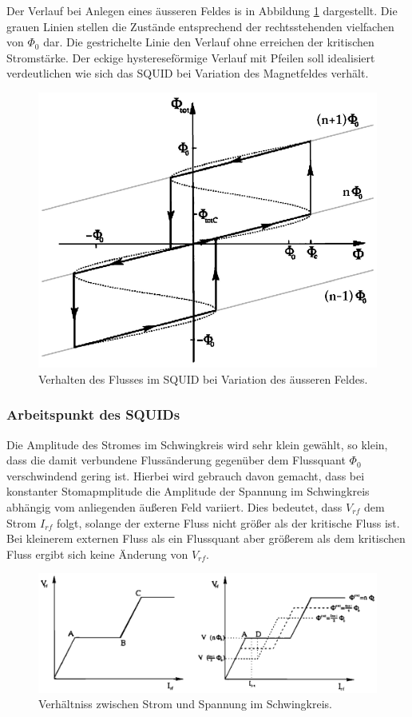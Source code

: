 \documentclass[12pt]{article}
\begin{document}
Der Verlauf bei Anlegen eines äusseren Feldes is in Abbildung \ref{verlauf} dargestellt. Die grauen Linien stellen die Zustände entsprechend der rechtsstehenden vielfachen von $\Phi_0$ dar. Die gestrichelte Linie den Verlauf ohne erreichen der kritischen Stromstärke. Der eckige hystereseförmige Verlauf mit Pfeilen soll idealisiert verdeutlichen wie sich das SQUID bei Variation des Magnetfeldes verhält. 
\begin{figure}[H]
\centering
\includegraphics[width=0.9\linewidth]{pictures/squid_feld_verlauf.eps}
\caption{Verhalten des Flusses im SQUID bei Variation des äusseren Feldes.}
\label{verlauf}
\end{figure}

\subsubsection{Arbeitspunkt des SQUIDs}
Die Amplitude des Stromes im Schwingkreis wird sehr klein gewählt, so klein, dass die damit verbundene Flussänderung gegenüber dem Flussquant 
$\Phi_0$ verschwindend gering ist. Hierbei wird gebrauch davon gemacht, dass bei konstanter Stomapmplitude die Amplitude der Spannung im Schwingkreis abhängig vom anliegenden äußeren Feld variiert. Dies bedeutet, dass $V_{rf}$ dem Strom $I_{rf}$ folgt, solange der externe Fluss
nicht größer als der kritische Fluss ist. Bei kleinerem externen Fluss als ein Flussquant aber größerem
als dem kritischen Fluss ergibt sich keine Änderung von $V_{rf}$. 
\begin{figure}[H]
\centering
\includegraphics[width=0.9\linewidth]{pictures/squid_strom_verlauf.eps}
\caption{Verhältniss zwischen Strom und Spannung im Schwingkreis.}
\end{figure}
\end{document}
